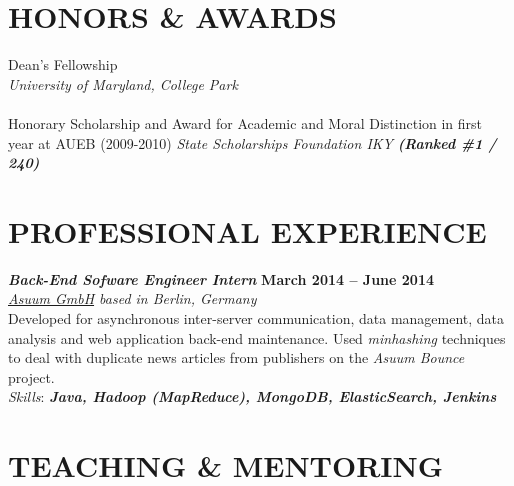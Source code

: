 \documentclass[margin, 10pt]{res} %
\begin{document}
\begin{resume}

\section{HONORS \& AWARDS}

   Dean's Fellowship \\
  \textit{University of Maryland, College Park}\\
  \\
   Honorary Scholarship and Award for Academic and Moral Distinction in first year at AUEB (2009-2010)
 \textit{State Scholarships Foundation IKY} {\sl \textbf{(Ranked \#1 / 240)}}


\section{PROFESSIONAL EXPERIENCE}

{\sl \textbf{Back-End Sofware Engineer Intern} } \hfill \textbf{March 2014 -- June 2014}\\
\textit{\href{http://www.asuum.com/products/}{Asuum GmbH} based in Berlin, Germany}\\
Developed for asynchronous inter-server communication, data management, data analysis and web application back-end maintenance. Used \textit{minhashing} techniques to deal with duplicate news articles from publishers on the \textit{Asuum Bounce} project.\\
\textit{Skills}: \textbf{\textit{Java, Hadoop (MapReduce), MongoDB, ElasticSearch, Jenkins}}


\section{TEACHING \& MENTORING}


\end{resume}
\end{document}
